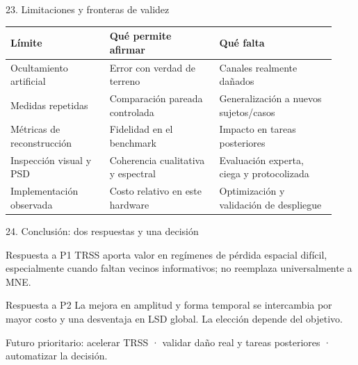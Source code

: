 \documentclass[aspectratio=169,10pt]{beamer}
\begin{document}
\begin{frame}{23. Limitaciones y fronteras de validez}
\small
\begin{tabular}{@{}>{\raggedright\arraybackslash}p{0.29\linewidth}>{\raggedright\arraybackslash}p{0.31\linewidth}>{\raggedright\arraybackslash}p{0.33\linewidth}@{}}
\toprule
\textbf{Límite} & \textbf{Qué permite afirmar} & \textbf{Qué falta}\\
\midrule
Ocultamiento artificial & Error con verdad de terreno & Canales realmente dañados\\
Medidas repetidas & Comparación pareada controlada & Generalización a nuevos sujetos/casos\\
Métricas de reconstrucción & Fidelidad en el benchmark & Impacto en tareas posteriores\\
Inspección visual y PSD & Coherencia cualitativa y espectral & Evaluación experta, ciega y protocolizada\\
Implementación observada & Costo relativo en este hardware & Optimización y validación de despliegue\\
\bottomrule
\end{tabular}
\vspace{0.7em}
\end{frame}

\begin{frame}{24. Conclusión: dos respuestas y una decisión}
\begin{block}{Respuesta a P1}
TRSS aporta valor en regímenes de pérdida espacial difícil, especialmente cuando faltan vecinos informativos; no reemplaza universalmente a MNE.
\end{block}
\begin{block}{Respuesta a P2}
La mejora en amplitud y forma temporal se intercambia por mayor costo y una desventaja en LSD global. La elección depende del objetivo.
\end{block}
\vspace{0.35em}
\vspace{0.35em}
\centering\small Futuro prioritario: acelerar TRSS · validar daño real y tareas posteriores · automatizar la decisión.
\end{frame}
\end{document}
